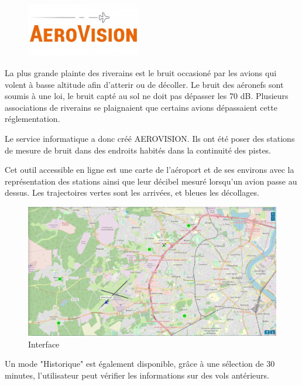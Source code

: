 \begin{figure}[hbt!]
  \centering
  \includegraphics[width=5cm]{Images/logo_aerovision.jpg}
  \label{fig:logoaerovision}
\end{figure}

La plus grande plainte des riverains est le bruit occasioné par les avions qui volent à basse altitude afin d'atterir ou de décoller.
Le bruit des aéronefs sont soumis à une loi, le bruit capté au sol ne doit pas dépasser les 70 dB. Plusieurs associations de riverains se plaignaient que certains avions dépassaient cette réglementation.\newline

Le service informatique a donc créé AEROVISION. Ils ont été poser des stations de mesure de bruit dans des endroits habités dans la continuité des pistes.

Cet outil accessible en ligne est une carte de l'aéroport et de ses environs avec la représentation des stations ainsi que leur décibel mesuré lorsqu'un avion passe au dessus. Les trajectoires vertes sont les arrivées, et bleues les décollages.

\begin{figure}[hbt!]
  \centering
  \includegraphics[width=17cm]{Images/aerovision.png}\newline
  \caption{Interface}
  \label{fig:interfaceaerovision}
\end{figure}

Un mode "Historique" est également disponible, grâce à une sélection de 30 minutes, l'utilisateur peut vérifier les informations sur des vols antérieurs.

